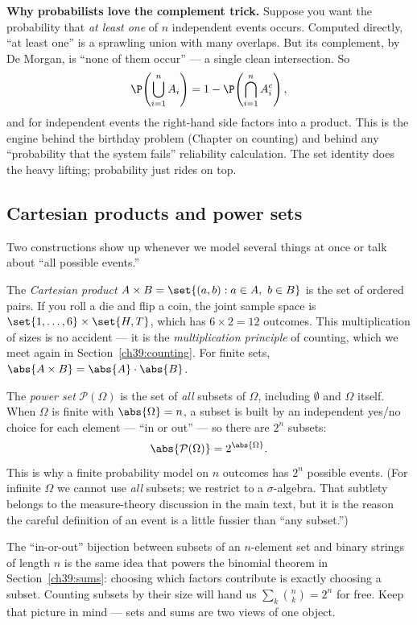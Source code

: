 \begin{happeningbox}
\textbf{Why probabilists love the complement trick.} Suppose you want the
probability that \emph{at least one} of $n$ independent events occurs. Computed
directly, ``at least one'' is a sprawling union with many overlaps. But its
complement, by De Morgan, is ``none of them occur'' --- a single clean
intersection. So
\[
  \P\!\left(\bigcup_{i=1}^n A_i\right) = 1 - \P\!\left(\bigcap_{i=1}^n
  A_i^c\right),
\]
and for independent events the right-hand side factors into a product. This is
the engine behind the birthday problem (Chapter on counting) and behind any
``probability that the system fails'' reliability calculation. The set
identity does the heavy lifting; probability just rides on top.
\end{happeningbox}

\subsection{Cartesian products and power sets}

Two constructions show up whenever we model several things at once or talk
about ``all possible events.''

The \emph{Cartesian product} $A \times B = \set{(a,b) : a \in A,\ b \in B}$ is
the set of ordered pairs. If you roll a die and flip a coin, the joint sample
space is $\set{1,\dots,6} \times \set{H,T}$, which has $6 \times 2 = 12$
outcomes. This multiplication of sizes is no accident --- it is the
\emph{multiplication principle} of counting, which we meet again in
Section~\ref{ch39:counting}. For finite sets, $\abs{A \times B} = \abs{A}\cdot
\abs{B}$.

The \emph{power set} $\mathcal{P}(\Omega)$ is the set of \emph{all} subsets of
$\Omega$, including $\emptyset$ and $\Omega$ itself. When $\Omega$ is finite
with $\abs{\Omega} = n$, a subset is built by an independent yes/no choice for
each element --- ``in or out'' --- so there are $2^n$ subsets:
\[
  \abs{\mathcal{P}(\Omega)} = 2^{\abs{\Omega}}.
\]
This is why a finite probability model on $n$ outcomes has $2^n$ possible
events. (For infinite $\Omega$ we cannot use \emph{all} subsets; we restrict
to a $\sigma$-algebra. That subtlety belongs to the measure-theory discussion
in the main text, but it is the reason the careful definition of an event is a
little fussier than ``any subset.'')

\begin{connectionbox}
The ``in-or-out'' bijection between subsets of an $n$-element set and binary
strings of length $n$ is the same idea that powers the binomial theorem in
Section~\ref{ch39:sums}: choosing which factors contribute is exactly choosing
a subset. Counting subsets by their size will hand us $\sum_k \binom{n}{k} =
2^n$ for free. Keep that picture in mind --- sets and sums are two views of
one object.
\end{connectionbox}

